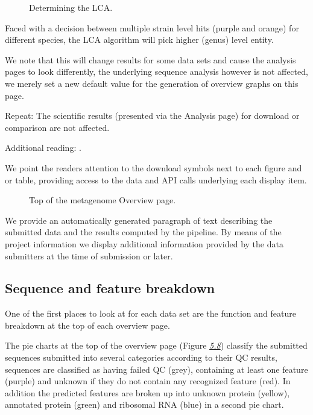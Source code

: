 \documentclass[letterpaper,10pt,english]{sphinxmanual}
\begin{document}
\begin{figure}[htbp]
\centering
\capstart

\noindent{}
\caption{Determining the LCA.}\label{\detokenize{user_manual:fig-lca}}\end{figure}

Faced with a decision between multiple strain level hits (purple and
orange) for different species, the LCA algorithm will pick higher
(genus) level entity.

We note that this will change results for some data sets and cause the
analysis pages to look differently, the underlying sequence analysis
however is not affected, we merely set a new default value for the
generation of overview graphs on this page.

Repeat: The scientific results (presented via the Analysis page) for
download or comparison are not affected.

Additional reading:
 .

We point the readers attention to the download symbols next to each
figure and or table, providing access to the data and API calls
underlying each display item.

\begin{figure}[htbp]
\centering
\capstart

\noindent{}
\caption{Top of the metagenome Overview page.}\label{\detokenize{user_manual:fig-metagenome-overview}}\end{figure}

We provide an automatically generated paragraph of text describing the
submitted data and the results computed by the pipeline. By means of the
project information we display additional information provided by the
data submitters at the time of submission or later.


\subsection{Sequence and feature breakdown}
\label{\detokenize{user_manual:sequence-and-feature-breakdown}}
One of the first places to look at for each data set are the function
and feature breakdown at the top of each overview page.

The pie charts at the top of the overview page (Figure
{\hyperref[\detokenize{user_manual:fig:classification-pie-chart}]{\emph{5.8}}}) classify the submitted
sequences submitted into several categories according to their QC
results, sequences are classified as having failed QC (grey), containing
at least one feature (purple) and unknown if they do not contain any
recognized feature (red). In addition the predicted features are broken
up into unknown protein (yellow), annotated protein (green) and
ribosomal RNA (blue) in a second pie chart.
\end{document}
